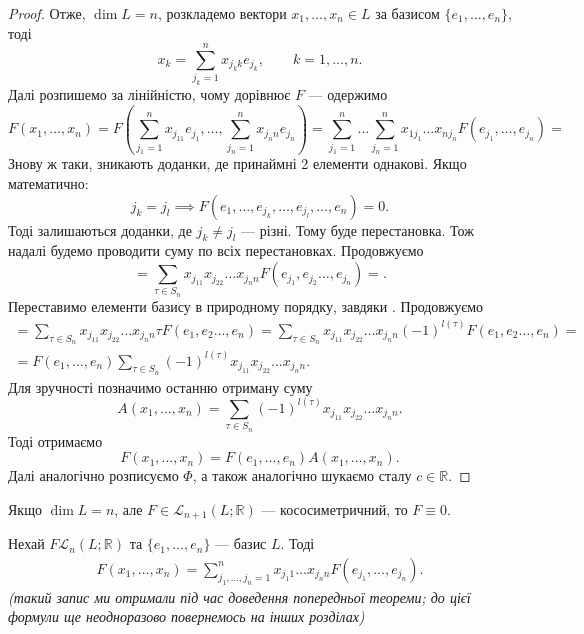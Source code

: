 \documentclass{math_library}
\begin{document}
\begin{proof}
Отже, $\dim L = n$, розкладемо вектори $x_1,\dots,x_n \in L$ за базисом $\{e_1,\dots,e_n\}$, тоді
\[
x_k = \displaystyle \sum_{j_k=1}^{n} x_{j_kk}e_{j_k},\qquad k = 1,\dots,n.
\]
Далі розпишемо за лінійністю, чому дорівнює $F$ --- одержимо
\[
F(x_1,\dots,x_n) = \displaystyle F\left(\sum_{j_1=1}^{n} x_{j_11}e_{j_1}, \dots, \sum_{j_n=1}^{n} x_{j_n n}e_{j_n}\right) = \sum_{j_1 = 1}^n \dots \sum_{j_n = 1}^n x_{1j_1}\dots x_{nj_n} F(e_{j_1},\dots,e_{j_n}) \boxed{=}
\]
Знову ж таки, зникають доданки, де принаймні 2 елементи однакові. Якщо математично:
\[
j_k = j_l \implies F(e_1,\dots, e_{j_k}, \dots, e_{j_l}, \dots, e_n) = 0.
\]
Тоді залишаються доданки, де $j_k \neq j_l$ --- різні. Тому буде перестановка. Тож надалі будемо проводити суму по всіх перестановках. Продовжуємо
\[
\displaystyle \boxed{=} \sum_{\tau \in S_n} x_{j_11}x_{j_22}\dots x_{j_nn} F(e_{j_1},e_{j_2}\dots, e_{j_n}) \boxed{=}.
\]
Переставимо елементи базису в природному порядку, завдяки . Продовжуємо
\begin{align*}
\boxed{=} \sum_{\tau \in S_n} x_{j_11}x_{j_22}\dots x_{j_nn} \tau F(e_1,e_2\dots, e_n) = \displaystyle \sum_{\tau \in S_n} x_{j_11}x_{j_22}\dots x_{j_nn} (-1)^{l(\tau)} F(e_1,e_2\dots, e_n) = \\ = \displaystyle F(e_1,\dots,e_n) \sum_{\tau \in S_n} (-1)^{l(\tau)} x_{j_11}x_{j_22}\dots x_{j_nn}.
\end{align*}
Для зручності позначимо останню отриману суму
\[
A(x_1,\dots,x_n) = \displaystyle \sum_{\tau \in S_n} (-1)^{l(\tau)} x_{j_11}x_{j_22}\dots x_{j_nn}.
\]
Тоді отримаємо \[
F(x_1,\dots,x_n) = F(e_1,\dots,e_n)A(x_1,\dots,x_n).
\]
Далі аналогічно розписуємо $\Phi$, а також аналогічно шукаємо сталу $c \in \mathbb{R}$. 
\end{proof}

\begin{remark}
Якщо $\dim L = n$, але $F \in \mathcal{L}_{n+1}(L;\mathbb{R})$ --- кососиметричний, то $F \equiv 0$.
\end{remark}

\begin{corollary}
Нехай $F \mathcal{L}_n(L;\mathbb{R})$ та $\{e_1,\dots,e_n\}$ --- базис $L$. Тоді
\begin{align*}
F(x_1,\dots,x_n) = \displaystyle\sum_{j_1,\dots,j_n=1}^n x_{j_1 1}\dots x_{j_n n} F(e_{j_1},\dots,e_{j_n}).
\end{align*}
\textit{(такий запис ми отримали під час доведення попередньої теореми; до цієї формули ще неодноразово повернемось на інших розділах)}
\end{corollary}
\end{document}
